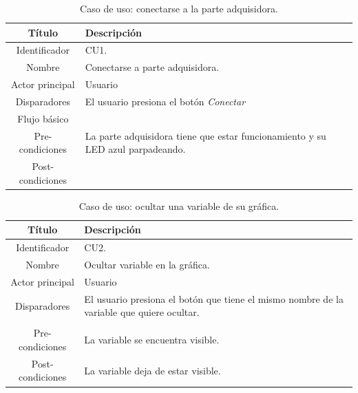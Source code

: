 \begin{table}[htpb]
	\centering
	\caption{Caso de uso: conectarse a la parte adquisidora.}
	\centering
	\begin{tabular}{c p{}}    
		\toprule
		\textbf{Título }     & \textbf{Descripción} \\
		\midrule
		Identificador		&  CU1. \\
		Nombre				&   Conectarse a parte adquisidora. \\
		Actor principal		&   Usuario \\
		Disparadores		&   El usuario presiona el botón \textit{Conectar} \\
		Flujo básico		&   \\
		Pre-condiciones		&   La parte adquisidora tiene que estar funcionamiento y su LED azul parpadeando. \\
		Post-condiciones	&    \\
		\bottomrule
	\end{tabular}
\label{tab:caso-conectar}
\end{table}

\begin{table}[htpb]
	\centering
	\caption{Caso de uso: ocultar una variable de su gráfica.}
	\centering
	\begin{tabular}{c p{}}    
		\toprule
		\textbf{Título }     & \textbf{Descripción} \\
		\midrule
		Identificador		&  CU2. \\
		Nombre				&   Ocultar variable en la gráfica. \\
		Actor principal		&   Usuario \\
		Disparadores		&   El usuario presiona el botón que tiene el mismo nombre de la variable que quiere ocultar. \\
\\
		Pre-condiciones		&   La variable se encuentra visible. \\
		Post-condiciones	&   La variable deja de estar visible.\\
		\bottomrule
	\end{tabular}
\label{tab:caso-ocultar}
\end{table}

